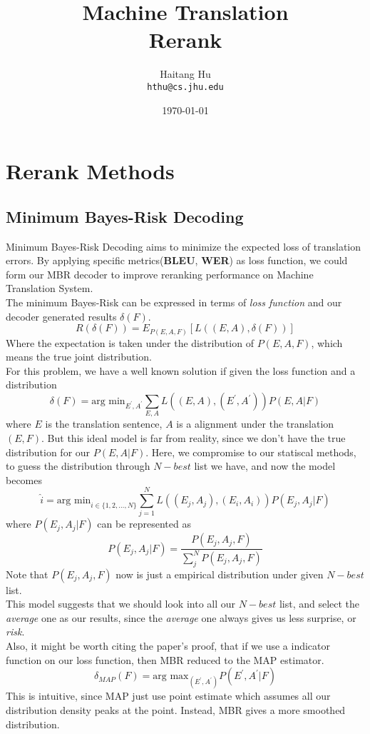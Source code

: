 \documentclass[11pt]{article}
\title{Machine Translation\\Rerank}
\author{Haitang Hu \\
  {\tt hthu@cs.jhu.edu}}
\date{\today}
\begin{document}
\large
\maketitle
\thispagestyle{headings}
\section{Rerank Methods} %
\label{sec:rerank_methods}
\subsection{Minimum Bayes-Risk Decoding} %
\label{sub:minimum_bayes_risk_decoding}
Minimum Bayes-Risk Decoding\cite{mbr} aims to minimize the expected loss of translation errors. By applying specific metrics(\textbf{BLEU}, \textbf{WER}) as loss function, we could form our MBR decoder to improve reranking performance on Machine Translation System.\\
The minimum Bayes-Risk can be expressed in terms of \textit{loss function} and our decoder generated results $\delta(F)$.
$$ R(\delta(F)) = E_{P(E,A,F)}[L((E,A),\delta(F))]$$
Where the expectation is taken under the distribution of $P(E,A,F)$, which means the true joint distribution.\\
For this problem, we have a well known solution if given the loss function and a distribution
$$ \delta(F) = \text{arg min}_{E^{\prime}, A^{\prime}} \sum_{E,A}L((E,A),(E^{\prime}, A^{\prime}))P(E,A|F) $$
where $E$ is the translation sentence, $A$ is a alignment under the translation $(E,F)$. But this ideal model is far from reality, since we don't have the true distribution for our $P(E,A|F)$. Here, we compromise to our statiscal methods, to guess the distribution through $N-best$ list we have, and now the model becomes
$$ \hat{i} = \text{arg min}_{i \in \{1,2,\dots, N\}} \sum_{j=1}^N L((E_j,A_j), (E_i,A_i))P(E_j,A_j|F)$$
where $P(E_j,A_j|F)$ can be represented as 
$$ P(E_j,A_j|F) = \frac{P(E_j,A_j,F)}{\sum_j^NP(E_j,A_j,F)}$$
Note that $P(E_j,A_j,F)$ now is just a empirical distribution under given $N-best$ list.\\
This model suggests that we should look into all our $N-best$ list, and select the \textit{average} one as our results, since the \textit{average} one always gives us less surprise, or \textit{risk}.\\
Also, it might be worth citing the paper's proof, that if we use a indicator function on our loss function, then MBR reduced to the MAP estimator.
$$ \delta_{MAP}(F) = \text{arg max}_{(E^{\prime}, A^{\prime})}P(E^{\prime}, A^{\prime}|F)$$
This is intuitive, since MAP just use point estimate which assumes all our distribution density peaks at the point. Instead, MBR gives a more smoothed distribution.
\end{document}
